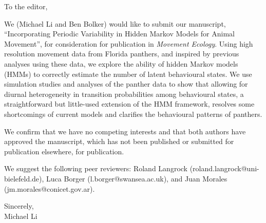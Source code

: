 \documentclass[10pt]{letter}
\begin{document}
\date{\today}

\begin{letter}{
} 

\opening{To the editor,}

We (Michael Li and Ben Bolker) would like to submit our manuscript,
``Incorporating Periodic Variability in Hidden Markov Models for
Animal Movement'', for consideration for publication in \emph{Movement
  Ecology}. Using high resolution movement data from Florida panthers,
and inspired by previous analyses using these data, we explore the
ability of hidden Markov models (HMMs) to correctly estimate the
number of latent behavioural states.  We use simulation studies and
analyses of the panther data to show that allowing for diurnal
heterogeneity in transition probabilities among behavioural states, a
straightforward but little-used extension of the HMM framework,
resolves some shortcomings of current models and clarifies the
behavioural patterns of panthers.

We confirm that we have no competing interests and that both authors
have approved the manuscript, which has not been published or
submitted for publication elsewhere, for publication.

We suggest the following peer reviewers: Roland Langrock (roland.langrock@uni-bielefeld.de),
Luca Borger (l.borger@swansea.ac.uk), and Juan Morales (jm.morales@conicet.gov.ar).

\closing{Sincerely,\\ Michael Li}


\end{letter}
\end{document}
